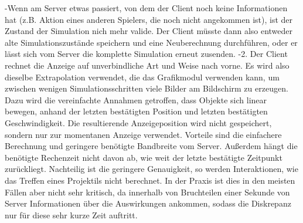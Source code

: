  -Wenn am Server etwas passiert, von dem der Client noch keine Informationen hat (z.B. Aktion eines anderen Spielers, die noch nicht angekommen ist), ist der Zustand der Simulation nich mehr valide. Der Client müsste dann also entweder alte Simulationszustände speichern und eine Neuberechnung durchführen, oder er lässt sich vom Server die komplette Simulation erneut zusenden.
-2. Der Client rechnet die Anzeige auf unverbindliche Art und Weise nach vorne. Es wird also dieselbe Extrapolation verwendet, die das Grafikmodul verwenden kann, um zwischen wenigen Simulationsschritten viele Bilder am Bildschirm zu erzeugen. Dazu wird die vereinfachte Annahmen getroffen, dass Objekte sich linear bewegen, anhand der letzten bestätigten Position und letzten bestätigten Geschwindigkeit. Die resultierende Anzeigeposition wird nicht gespeichert, sondern nur zur momentanen Anzeige verwendet. Vorteile sind die einfachere Berechnung und geringere benötigte Bandbreite vom Server. Außerdem hängt die benötigte Rechenzeit nicht davon ab, wie weit der letzte bestätigte Zeitpunkt zurückliegt. Nachteilig ist die geringere Genauigkeit, so werden Interaktionen, wie das Treffen eines Projektils nicht berechnet. In der Praxis ist dies in den meisten Fällen aber nicht sehr kritisch, da innerhalb von Bruchteilen einer Sekunde von Server Informationen über die Auswirkungen ankommen, sodass die Diskrepanz nur für diese sehr kurze Zeit auftritt.

